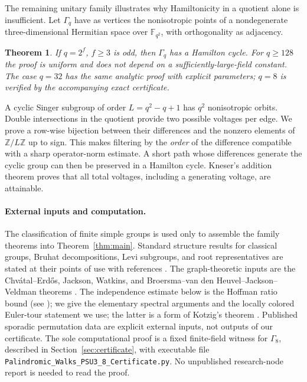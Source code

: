 \documentclass[11pt]{article}
\newtheorem{theorem}{Theorem}[section]
\theoremstyle{definition}
\newcommand{\F}{\mathbb F}
\newcommand{\Z}{\mathbb Z}
\begin{document}
The remaining unitary family illustrates why Hamiltonicity in a quotient alone is insufficient. Let $\Gamma_q$ have as vertices the nonisotropic points of a nondegenerate three-dimensional Hermitian space over $\F_{q^2}$, with orthogonality as adjacency.
\begin{theorem}\label{thm:introunitary}
If $q=2^f$, $f\ge3$ is odd, then $\Gamma_q$ has a Hamilton cycle. For $q\ge128$ the proof is uniform and does not depend on a sufficiently-large-field constant. The case $q=32$ has the same analytic proof with explicit parameters; $q=8$ is verified by the accompanying exact certificate.
\end{theorem}
A cyclic Singer subgroup of order $L=q^2-q+1$ has $q^2$ nonisotropic orbits. Double intersections in the quotient provide two possible voltages per edge. We prove a row-wise bijection between their differences and the nonzero elements of $\Z/L\Z$ up to sign. This makes filtering by the \emph{order} of the difference compatible with a sharp operator-norm estimate. A short path whose differences generate the cyclic group can then be preserved in a Hamilton cycle. Kneser's addition theorem \cite{Kneser} proves that all total voltages, including a generating voltage, are attainable.

\paragraph{External inputs and computation.}
The classification of finite simple groups \cite{GLS} is used only to assemble the family theorems into Theorem~\ref{thm:main}. Standard structure results for classical groups, Bruhat decompositions, Levi subgroups, and root representatives are stated at their points of use with references \cite{Taylor,CarterSimple,CarterFinite}. The graph-theoretic inputs are the Chv\'atal--Erd\H{o}s, Jackson, Watkins, and Broersma--van den Heuvel--Jackson--Veldman theorems \cite{CE,Jackson,Watkins,BHVJ}. The independence estimate below is the Hoffman ratio bound (see \cite{BrouwerHaemers}); we give the elementary spectral arguments and the locally colored Euler-tour statement we use; the latter is a form of Kotzig's theorem \cite{Kotzig}. Published sporadic permutation data are explicit external inputs, not outputs of our certificate. The sole computational proof is a fixed finite-field witness for $\Gamma_8$, described in Section~\ref{sec:certificate}, with executable file \texttt{Palindromic\_Walks\_PSU3\_8\_Certificate.py}. No unpublished research-node report is needed to read the proof.
\end{document}
